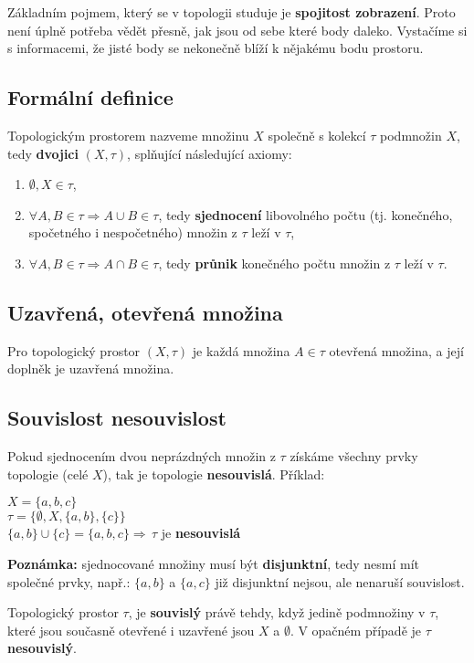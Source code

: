 Základním pojmem, který se v topologii studuje je \textbf{spojitost zobrazení}. Proto není úplně potřeba vědět přesně, jak jsou od sebe které body daleko. Vystačíme si s informacemi, že jisté body se nekonečně blíží k nějakému bodu prostoru.

\subsection{Formální definice}
Topologickým prostorem nazveme množinu $X$ společně s kolekcí $\tau$ podmnožin $X$, tedy \textbf{dvojici} $(X, \tau)$, splňující následující axiomy:
\begin{enumerate}
    \item $\emptyset, X \in \tau$,
    \item $\forall A, B \in \tau \Rightarrow  A \cup B \in \tau $, tedy \textbf{sjednocení} libovolného počtu (tj. konečného, spočetného i nespočetného) množin z $\tau$ leží v $\tau$,
    \item $\forall A, B \in \tau \Rightarrow A \cap B \in \tau $, tedy \textbf{průnik} konečného počtu množin z $\tau$ leží v $\tau$.
\end{enumerate}

\subsection{Uzavřená, otevřená množina}
Pro topologický prostor $(X, \tau)$ je každá množina $A \in \tau$ otevřená množina, a její doplněk je uzavřená množina.

\subsection{Souvislost nesouvislost}
Pokud sjednocením dvou neprázdných množin z $\tau$ získáme všechny prvky topologie (celé $ X $), tak je topologie \textbf{nesouvislá}. Příklad:

\begin{center}
    \begin{minipage}[t]{0.50\textwidth}
        $X = \{a, b, c\}$\\
        $\tau = \{\emptyset, X, \{a, b\}, \{c\}\}$\\
        $\{a, b\} \cup \{c\}  = \{a, b, c\} \Rightarrow \, \tau$ je \textbf{nesouvislá}
    \end{minipage}
    \begin{minipage}[t]{0.40\textwidth}
        \textbf{Poznámka:} sjednocované množiny musí být \textbf{disjunktní}, tedy nesmí mít společné prvky, např.: $\{a, b\}$ a $\{a, c\}$ již disjunktní nejsou, ale nenaruší souvislost.
    \end{minipage}
\end{center}
\smallskip
Topologický prostor $ \tau $, je \textbf{souvislý} právě tehdy, když jedině podmnožiny v $\tau$, které jsou současně otevřené i uzavřené jsou $X$ a $\emptyset$. V opačném případě je $\tau$ \textbf{nesouvislý}.

